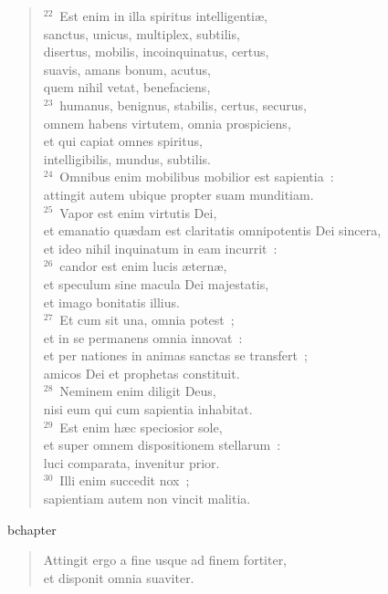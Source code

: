 \begin{verse}${}^{22}$~Est enim in illa spiritus intelligenti\ae ,\\ sanctus, unicus, multiplex, subtilis,\\ disertus, mobilis, incoinquinatus, certus,\\ suavis, amans bonum, acutus,\\ quem nihil vetat, benefaciens,\\
${}^{23}$~humanus, benignus, stabilis, certus, securus,\\ omnem habens virtutem, omnia prospiciens,\\ et qui capiat omnes spiritus,\\ intelligibilis, mundus, subtilis.\\
${}^{24}$~Omnibus enim mobilibus mobilior est sapientia~:\\ attingit autem ubique propter suam munditiam.\\
${}^{25}$~Vapor est enim virtutis Dei,\\ et emanatio qu\ae dam est claritatis omnipotentis Dei sincera,\\ et ideo nihil inquinatum in eam incurrit~:\\
${}^{26}$~candor est enim lucis \ae tern\ae ,\\ et speculum sine macula Dei majestatis,\\ et imago bonitatis illius.\\
${}^{27}$~Et cum sit una, omnia potest~;\\ et in se permanens omnia innovat~:\\ et per nationes in animas sanctas se transfert~;\\ amicos Dei et prophetas constituit.\\
${}^{28}$~Neminem enim diligit Deus,\\ nisi eum qui cum sapientia inhabitat.\\
${}^{29}$~Est enim h\ae c speciosior sole,\\ et super omnem dispositionem stellarum~:\\ luci comparata, invenitur prior.\\
${}^{30}$~Illi enim succedit nox~;\\ sapientiam autem non vincit malitia.\end{verse}


bchapter\begin{verse}\vspace{-19pt}Attingit ergo a fine usque ad finem fortiter,\\ et disponit omnia suaviter.\end{verse}


